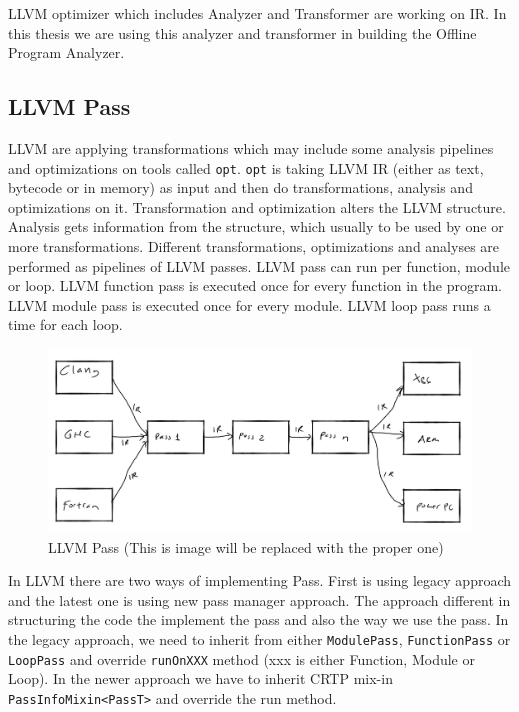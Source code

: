 LLVM optimizer \textemdash{} which includes Analyzer and Transformer \textemdash{} are working on IR. In this thesis we are using this analyzer and transformer in building the Offline Program Analyzer.

\subsection{LLVM Pass}

LLVM are applying transformations \textemdash{} which may include some analysis pipelines \textemdash{} and optimizations on tools called \texttt{opt}. \texttt{opt} is taking LLVM IR (either as text, bytecode or in memory) as input and then do transformations, analysis and optimizations on it. Transformation and optimization alters the LLVM structure. Analysis gets information from the structure, which usually to be used by one or more transformations. Different transformations, optimizations and analyses are performed as pipelines of LLVM passes. LLVM pass can run per function, module or loop. LLVM function pass is executed once for every function in the program. LLVM module pass is executed once for every module. LLVM loop pass runs a time for each loop.  

\begin{figure}[htbp] 
    \centerline{\includegraphics[scale=.25]{Figures/llvm.png}} 
    \caption{LLVM Pass (This is image will be replaced with the proper one)} 
    \label{fig:2-2} 
\end{figure} 

In LLVM there are two ways of implementing Pass. First is using legacy approach and the latest one is using new pass manager approach. The approach different in structuring the code the implement the pass and also the way we use the pass.  In the legacy approach, we need to inherit from either \texttt{ModulePass}, \texttt{FunctionPass} or \texttt{LoopPass} and override \texttt{runOnXXX} method (xxx is either Function, Module or Loop). In the newer approach we have to inherit CRTP mix-in \texttt{PassInfoMixin<PassT>} and override the run method.

